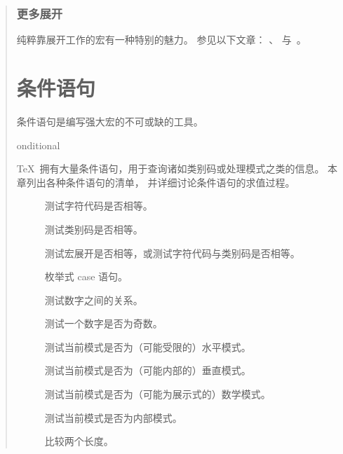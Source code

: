 \documentclass[a4paper]{rapport3}
\newenvironment{disp}{\begin{quotation}}{\end{quotation}}
\newenvironment{inventory}{\begin{description}}{\end{description}}
\def\term#1\par{\index{#1}}
\begin{document}
\begin{disp}
\subsection{更多展开}

纯粹靠展开工作的宏有一种特别的魅力。
参见以下文章：
\cite{E2}、\cite{Jeffrey:lists} 与~\cite{Maus2}。


\endofchapter
\chapter{条件语句}\label{if}

条件语句是编写强大宏的不可或缺的工具。
\term conditional\par
\TeX\ 拥有大量条件语句，用于查询诸如类别码或处理模式之类的信息。
本章列出各种条件语句的清单，
并详细讨论条件语句的求值过程。

\begin{inventory}
\item [] 
      测试字符代码是否相等。 

\item [] 
      测试类别码是否相等。 

\item [] 
      测试宏展开是否相等，或测试字符代码与类别码是否相等。

\item [] 
      枚举式 case 语句。

\item [] 
      测试数字之间的关系。

\item [] 
      测试一个数字是否为奇数。

\item [] 
      测试当前模式是否为（可能受限的）水平模式。

\item [] 
      测试当前模式是否为（可能内部的）垂直模式。

\item [] 
     测试当前模式是否为（可能为展示式的）数学模式。

\item [] 
      测试当前模式是否为内部模式。

\item [] 
      比较两个长度。


\end{inventory}
\end{disp}
\end{document}
